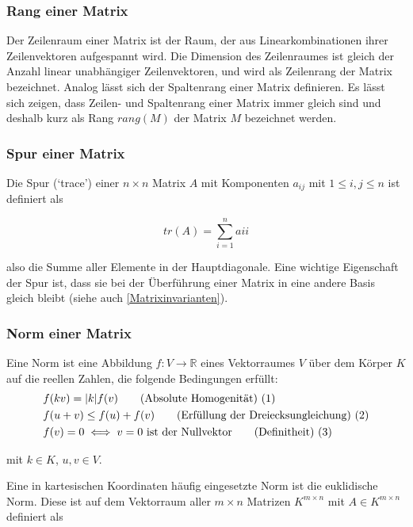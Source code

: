 \documentclass[a4paper,fontsize=12pt,toc=bib,halfparskip,ngerman]{scrartcl}
\begin{document}
\subsubsection{Rang einer Matrix}
Der Zeilenraum einer Matrix ist der Raum, der aus Linearkombinationen ihrer Zeilenvektoren aufgespannt wird. Die Dimension des Zeilenraumes ist gleich der Anzahl linear unabh\"angiger Zeilenvektoren, und wird als Zeilenrang der Matrix bezeichnet. Analog l\"asst sich der Spaltenrang einer Matrix definieren. Es l\"asst sich zeigen, dass Zeilen- und Spaltenrang einer Matrix immer gleich sind und deshalb kurz als Rang $rang(M)$ der Matrix $M$ bezeichnet werden.

\subsubsection{Spur einer Matrix}
Die Spur (`trace') einer $n\times n$ Matrix $A$ mit Komponenten $a_{ij}$ mit $1 \leq i,j \leq n$ ist definiert als

\begin{equation}
	tr(A) = \sum_{i = 1}^{n} a{ii}
\end{equation}

also die Summe aller Elemente in der Hauptdiagonale. Eine wichtige Eigenschaft der Spur ist, dass sie bei der \"Uberf\"uhrung einer Matrix in eine andere Basis gleich bleibt (siehe auch \cref{Matrixinvarianten}).


\subsubsection{Norm einer Matrix}
Eine Norm ist eine Abbildung $f: V \rightarrow \mathbb{R}$ eines Vektorraumes $V$ \"uber dem K\"orper $K$ auf die reellen Zahlen, die folgende Bedingungen erf\"ullt:
\begin{align}
	&f(kv) = |k|f(v) \tag{Absolute Homogenit\"at) (\addtocounter{equation}{1}\theequation}\\
	&f(u+v) \leq f(u) + f(v) \tag{Erf\"ullung der Dreiecksungleichung) (\addtocounter{equation}{1}\theequation}\\
	&f(v) = 0 \iff v=0 \text{ ist der Nullvektor} \tag{Definitheit) (\addtocounter{equation}{1}\theequation}
\end{align}

mit $k \in K$, $u,v \in V$.


Eine in kartesischen Koordinaten h\"aufig eingesetzte Norm ist die euklidische Norm. Diese ist auf dem Vektorraum aller $m \times n$ Matrizen $K^{m\times n}$ mit $A \in K^{m\times n}$ definiert als
\end{document}
